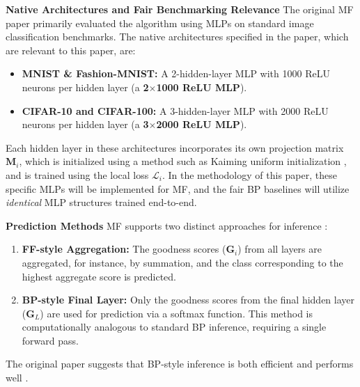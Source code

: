 \textbf{Native Architectures and Fair Benchmarking Relevance}
The original MF paper \cite{gong2025mono} primarily evaluated the algorithm using MLPs on standard image classification benchmarks. The native architectures specified in the paper, which are relevant to this paper, are:
\begin{itemize}
    \item \textbf{MNIST \& Fashion-MNIST:} A 2-hidden-layer MLP with 1000 ReLU neurons per hidden layer (a \textbf{2$\times$1000 ReLU MLP}).
    \item \textbf{CIFAR-10 and CIFAR-100:} A 3-hidden-layer MLP with 2000 ReLU neurons per hidden layer (a \textbf{3$\times$2000 ReLU MLP}).
\end{itemize}
Each hidden layer in these architectures incorporates its own projection matrix $\mathbf{M}_i$, which is initialized using a method such as Kaiming uniform initialization \cite{he2015delving}, and is trained using the local loss $\mathcal{L}_i$. In the methodology of this paper, these specific MLPs will be implemented for MF, and the fair BP baselines will utilize \emph{identical} MLP structures trained end-to-end.

\pagebreak
\textbf{Prediction Methods}
MF supports two distinct approaches for inference \cite{gong2025mono}:
\begin{enumerate}
    \item \textbf{FF-style Aggregation:} The goodness scores ($\mathbf{G}_i$) from all layers are aggregated, for instance, by summation, and the class corresponding to the highest aggregate score is predicted.
    \item \textbf{BP-style Final Layer:} Only the goodness scores from the final hidden layer ($\mathbf{G}_L$) are used for prediction via a softmax function. This method is computationally analogous to standard BP inference, requiring a single forward pass.
\end{enumerate}
The original paper suggests that BP-style inference is both efficient and performs well \cite{gong2025mono}.

